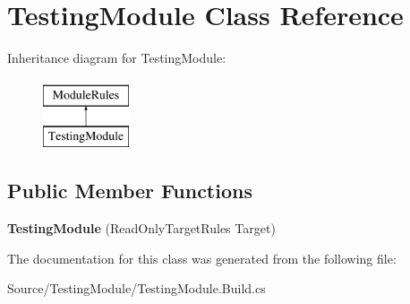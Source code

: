 \hypertarget{class_testing_module}{}\section{Testing\+Module Class Reference}
\label{class_testing_module}
Inheritance diagram for Testing\+Module\+:\begin{figure}[H]
\begin{center}
\leavevmode
\includegraphics[height=2.000000cm]{class_testing_module}
\end{center}
\end{figure}
\subsection*{Public Member Functions}
\begin{DoxyCompactItemize}
\item 
\mbox{\label{class_testing_module_aa52e5bcee3093b473e13827ab5fdfe5d}} 
{\bfseries Testing\+Module} (Read\+Only\+Target\+Rules Target)
\end{DoxyCompactItemize}


The documentation for this class was generated from the following file\+:\begin{DoxyCompactItemize}
\item 
Source/\+Testing\+Module/Testing\+Module.\+Build.\+cs\end{DoxyCompactItemize}
